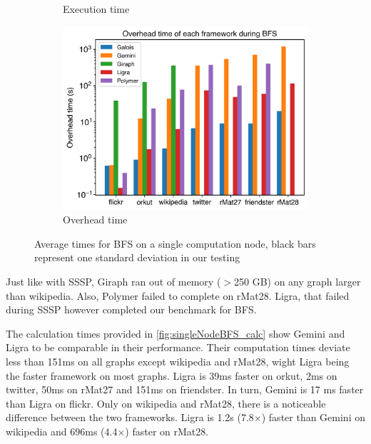 \begin{figure}
\begin{subfigure}{0.32\textwidth}
		\caption{Execution time}
		\label{fig:singleNodeBFS_exec}
	\end{subfigure}
	\hfil
	\begin{subfigure}{0.32\textwidth}
		\includegraphics[width=\linewidth]{../../plots/singleNodeBFS_overheadTime.png}
		\caption{Overhead time}
		\label{fig:singleNodeBFS_overheadNormalized}
	\end{subfigure}
	\caption{Average times for BFS on a single computation node, black bars represent one standard deviation in our testing}
\end{figure}
Just like with SSSP, Giraph ran out of memory ($>$250 GB) on any graph larger than wikipedia. Also, Polymer failed to complete on rMat28. Ligra, that failed during SSSP however completed our benchmark for BFS.

The calculation times provided in \autoref{fig:singleNodeBFS_calc} show Gemini and Ligra to be comparable in their performance. 
Their computation times deviate less than 151ms on all graphs except wikipedia and rMat28, wight Ligra being the faster framework on most graphs.
Ligra is 39ms faster on orkut, 2ms on twitter, 50ms on rMat27 and 151ms on friendster.
In turn, Gemini is 17 ms faster than Ligra on flickr.
Only on wikipedia and rMat28, there is a noticeable difference between the two frameworks. Ligra is 1.2s (7.8$\times$) faster than Gemini on wikipedia and 696ms (4.4$\times$) faster on rMat28.


